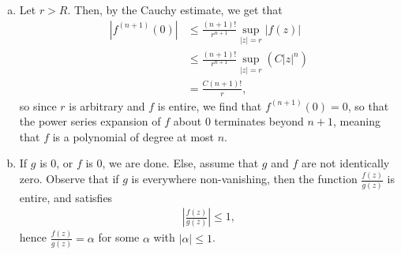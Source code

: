 \documentclass[10pt]{mypackage}
\begin{document}
\begin{solution}\hfill
  \begin{enumerate}[(a)]
    \item Let $r > R$. Then, by the Cauchy estimate, we get that
      \begin{align*}
        \left\vert f^{\left(n+1\right)}(0) \right\vert &\leq \frac{\left( n+1 \right)!}{r^{n+1}}\sup_{|z| = r} \left\vert f(z) \right\vert\\
                                                       &\leq \frac{\left( n+1 \right)!}{r^{n+1}} \sup_{|z| = r} \left( C \left\vert z \right\vert^{n} \right)\\
                                                       &= \frac{C\left( n+1 \right)!}{r},
      \end{align*}
      so since $r$ is arbitrary and $f$ is entire, we find that $ f^{(n+1)}(0) = 0 $, so that the power series expansion of $f$ about $0$ terminates beyond $n + 1$, meaning that $f$ is a polynomial of degree at most $n$.
    \item If $g$ is $0$, or $f$ is $0$, we are done. Else, assume that $g$ and $f$ are not identically zero. Observe that if $g$ is everywhere non-vanishing, then the function $ \frac{f(z)}{g(z)} $ is entire, and satisfies
      \begin{align*}
        \left\vert \frac{f(z)}{g(z)} \right\vert \leq 1,
      \end{align*}
      hence $ \frac{f(z)}{g(z)} = \alpha $ for some $\alpha$ with $\left\vert \alpha \right\vert \leq 1$.\newline


\end{enumerate}
\end{solution}
\end{document}
